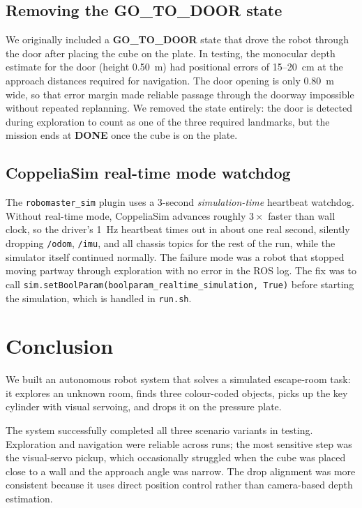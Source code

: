 \documentclass[conference]{IEEEtran}
\begin{document}
\subsection{Removing the GO\_TO\_DOOR state}

We originally included a \textbf{GO\_TO\_DOOR} state that drove the
robot through the door after placing the cube on the plate.
In testing, the monocular depth estimate for the door
(height 0.50~m) had positional errors of 15--20~cm at the approach
distances required for navigation.
The door opening is only 0.80~m wide, so that error margin made
reliable passage through the doorway impossible without repeated
replanning.
We removed the state entirely: the door is detected during
exploration to count as one of the three required landmarks, but the
mission ends at \textbf{DONE} once the cube is on the plate.

\subsection{CoppeliaSim real-time mode watchdog}

The \texttt{robomaster\_sim} plugin uses a 3-second
\emph{simulation-time} heartbeat watchdog.
Without real-time mode, CoppeliaSim advances roughly $3\times$ faster
than wall clock, so the driver's 1~Hz heartbeat times out in about
one real second, silently dropping \texttt{/odom}, \texttt{/imu},
and all chassis topics for the rest of the run, while the simulator
itself continued normally.
The failure mode was a robot that stopped moving partway through
exploration with no error in the ROS log.
The fix was to call
\texttt{sim.setBoolParam(\allowbreak boolparam\_realtime\_simulation,~True)}
before starting the simulation, which is handled in \texttt{run.sh}.

\section{Conclusion}
\label{sec:conclusion}

We built an autonomous robot system that solves a simulated
escape-room task: it explores an unknown room, finds three
colour-coded objects, picks up the key cylinder with visual
servoing, and drops it on the pressure plate.

The system successfully completed all three scenario variants in
testing.
Exploration and navigation were reliable across runs; the most
sensitive step was the visual-servo pickup, which occasionally
struggled when the cube was placed close to a wall and the approach
angle was narrow.
The drop alignment was more consistent because it uses direct
position control rather than camera-based depth estimation.
\end{document}
